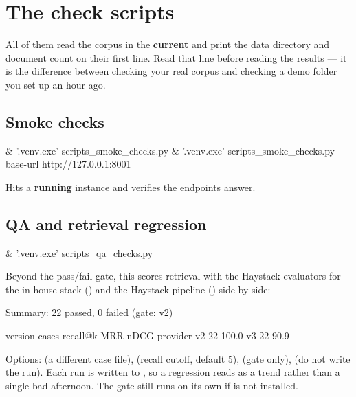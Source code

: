 \section{The check scripts}

All of them read the corpus in the \textbf{current} 
and print the data directory and document count on their first line. Read that
line before reading the results --- it is the difference between checking your
real corpus and checking a demo folder you set up an hour ago.

\subsection{Smoke checks}

\begin{shellblock}
& '.venv\Scripts\python.exe' scripts\run_smoke_checks.py
& '.venv\Scripts\python.exe' scripts\run_smoke_checks.py --base-url http://127.0.0.1:8001
\end{shellblock}

Hits a \textbf{running} instance and verifies the endpoints answer.

\subsection{QA and retrieval regression}

\begin{shellblock}
& '.venv\Scripts\python.exe' scripts\run_qa_checks.py
\end{shellblock}

Beyond the pass/fail gate, this scores retrieval with the Haystack evaluators for
the in-house stack () and the Haystack pipeline () side by
side:

\begin{shellblock}
Summary: 22 passed, 0 failed (gate: v2)

version     cases   recall@k      MRR     nDCG  provider
v2             22     100.0%
v3             22      90.9%
\end{shellblock}

Options:  (a different case file),  (recall cutoff,
default 5),  (gate only),  (do not write
the run). Each run is written to , so a
regression reads as a trend rather than a single bad afternoon. The gate still
runs on its own if  is not installed.

